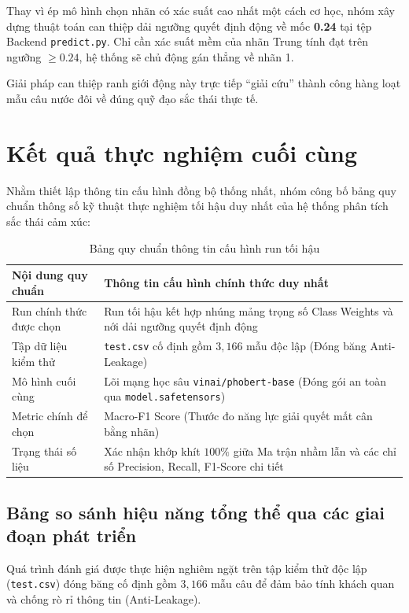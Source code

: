 \documentclass[conference,10pt,a4paper]{IEEEtran}
\begin{document}
Thay vì ép mô hình chọn nhãn có xác suất cao nhất một cách cơ học, nhóm xây dựng thuật toán can thiệp dải ngưỡng quyết định động về mốc \textbf{0.24} tại tệp Backend \texttt{predict.py}. Chỉ cần xác suất mềm của nhãn Trung tính đạt trên ngưỡng $\ge 0.24$, hệ thống sẽ chủ động gán thẳng về nhãn 1. 

Giải pháp can thiệp ranh giới động này trực tiếp ``giải cứu'' thành công hàng loạt mẫu câu nước đôi về đúng quỹ đạo sắc thái thực tế.

\section{Kết quả thực nghiệm cuối cùng}
Nhằm thiết lập thông tin cấu hình đồng bộ thống nhất, nhóm công bố bảng quy chuẩn thông số kỹ thuật thực nghiệm tối hậu duy nhất của hệ thống phân tích sắc thái cảm xúc:

\begin{table}[H] %
\centering
\caption{Bảng quy chuẩn thông tin cấu hình run tối hậu}
\vspace{0.15cm}
\small
\renewcommand{\arraystretch}{1.3} %
\begin{tabularx}{\linewidth}{|>{\centering\arraybackslash}p{2.5cm}|X|}
\hline
\textbf{Nội dung quy chuẩn} & \textbf{Thông tin cấu hình chính thức duy nhất} \\
\hline
Run chính thức được chọn & Run tối hậu kết hợp nhúng mảng trọng số Class Weights và nới dải ngưỡng quyết định động \\
\hline
Tập dữ liệu kiểm thử & \texttt{test.csv} cố định gồm $3,166$ mẫu độc lập (Đóng băng Anti-Leakage) \\
\hline
Mô hình cuối cùng & Lõi mạng học sâu \texttt{vinai/phobert-base} (Đóng gói an toàn qua \texttt{model.safetensors}) \\
\hline
Metric chính để chọn & Macro-F1 Score (Thước đo năng lực giải quyết mất cân bằng nhãn) \\
\hline
Trạng thái số liệu & Xác nhận khớp khít $100\%$ giữa Ma trận nhầm lẫn và các chỉ số Precision, Recall, F1-Score chi tiết \\
\hline
\end{tabularx}
\end{table}

\subsection{Bảng so sánh hiệu năng tổng thể qua các giai đoạn phát triển} 
Quá trình đánh giá được thực hiện nghiêm ngặt trên tập kiểm thử độc lập (\texttt{test.csv}) đóng băng cố định gồm $3,166$ mẫu câu để đảm bảo tính khách quan và chống rò rỉ thông tin (Anti-Leakage).
\end{document}
